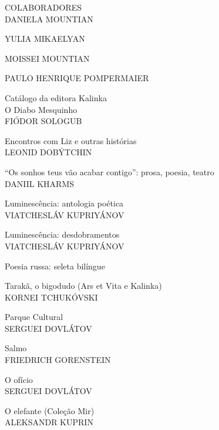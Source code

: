 \newpage
\small\MyriadPro
\label{autora}

\noindent{}COLABORADORES\\

\noindent{}DANIELA MOUNTIAN \lipsum[1]


\medskip

\noindent{}YULIA MIKAELYAN \lipsum[1]

\medskip

\noindent{}MOISSEI MOUNTIAN \lipsum[1]

\medskip

\noindent{}PAULO HENRIQUE POMPERMAIER \lipsum[1] 

\afterpage{\blankpage}

\newpage
\pagestyle{empty}
\MyriadPro

\noindent{}Catálogo da editora Kalinka\\[5pt]

\noindent{}O Diabo Mesquinho\\
FIÓDOR SOLOGUB
\medskip

\noindent{}Encontros com Liz e outras histórias\\
LEONID DOBÝTCHIN
\medskip

\noindent{}``Os sonhos teus vão acabar contigo'': prosa, poesia, teatro\\
DANIIL KHARMS
\medskip

\noindent{}Luminescência: antologia poética\\
VIATCHESLÁV KUPRIYÁNOV
\medskip

\noindent{}Luminescência: desdobramentos\\
VIATCHESLÁV KUPRIYÁNOV
\medskip

\noindent{}Poesia russa: seleta bilíngue
\medskip

\noindent{}Tarakã, o bigodudo (Ars et Vita e Kalinka)\\
KORNEI TCHUKÓVSKI
\medskip

\noindent{}Parque Cultural\\
SERGUEI DOVLÁTOV
\medskip

\noindent{}Salmo\\
FRIEDRICH GORENSTEIN
\medskip

\noindent{}O ofício\\
SERGUEI DOVLÁTOV
\medskip

\noindent{}O elefante (Coleção Mir)\\
ALEKSANDR KUPRIN
\medskip

